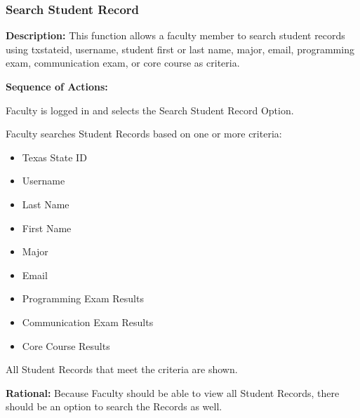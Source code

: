    \subsubsection{\large Search Student Record} 
   \begin{boxed} %
      \textbf{Description:}
      {\small This function allows a faculty member to search student records
         using txstateid, username, student first or last name, major,
         email, programming exam, communication exam, or core course as
         criteria.}
         
         \textbf{Sequence of Actions:}
         \begin{enumerate}
               {\small
            \item Faculty is logged in and selects the Search Student Record Option.
            \item Faculty searches Student Records based on one or more criteria:
               \begin{itemize}
                  \item Texas State ID
                  \item Username
                  \item Last Name
                  \item First Name
                  \item Major
                  \item Email
                  \item Programming Exam Results
                  \item Communication Exam Results
                  \item Core Course Results
               \end{itemize}
            \item All Student Records that meet the criteria are shown.}
      \end{enumerate}

         \textbf{Rational:}
         {\small Because Faculty should be able to view all Student Records, there
         should be an option to search the Records as well.}
   \end{boxed} %

